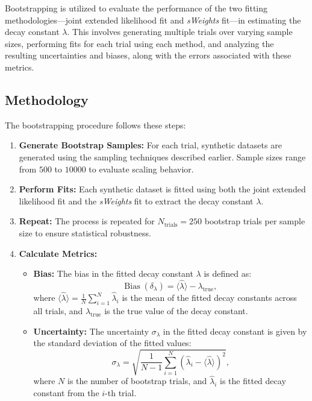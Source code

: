 \documentclass[11pt, a4paper]{article}
\begin{document}
Bootstrapping is utilized to evaluate the performance of the two fitting methodologies—joint extended likelihood fit and \textit{sWeights} fit—in estimating the decay constant \(\lambda\). This involves generating multiple trials over varying sample sizes, performing fits for each trial using each method, and analyzing the resulting uncertainties and biases, along with the errors associated with these metrics.

\subsection{Methodology}

The bootstrapping procedure follows these steps:

\begin{enumerate}
    \item \textbf{Generate Bootstrap Samples:} For each trial, synthetic datasets are generated using the sampling techniques described earlier. Sample sizes range from \(500\) to \(10000\) to evaluate scaling behavior.
    
    \item \textbf{Perform Fits:} Each synthetic dataset is fitted using both the joint extended likelihood fit and the \textit{sWeights} fit to extract the decay constant \(\lambda\).

    \item \textbf{Repeat:} The process is repeated for \(N_{\text{trials}} = 250\) bootstrap trials per sample size to ensure statistical robustness.

    \item \textbf{Calculate Metrics:}
    \begin{itemize}
        \item \textbf{Bias:} The bias in the fitted decay constant \(\lambda\) is defined as:
        \begin{equation}
        \text{Bias} \; (\delta_{\lambda}) = \langle \hat{\lambda} \rangle - \lambda_{\text{true}},
        \label{eq:bias_definition}
        \end{equation}
        where \( \langle \hat{\lambda} \rangle = \frac{1}{N} \sum_{i=1}^{N} \hat{\lambda}_i \) is the mean of the fitted decay constants across all trials, and \( \lambda_{\text{true}} \) is the true value of the decay constant.

        \item \textbf{Uncertainty:} The uncertainty \(\sigma_{\lambda}\) in the fitted decay constant is given by the standard deviation of the fitted values:
        \begin{equation}
        \sigma_{\lambda} = \sqrt{\frac{1}{N-1} \sum_{i=1}^{N} \left( \hat{\lambda}_i - \langle \hat{\lambda} \rangle \right)^2},
        \label{eq:uncertainty}
        \end{equation}
        where \(N\) is the number of bootstrap trials, and \(\hat{\lambda}_i\) is the fitted decay constant from the \(i\)-th trial.


\end{itemize}
\end{enumerate}
\end{document}
